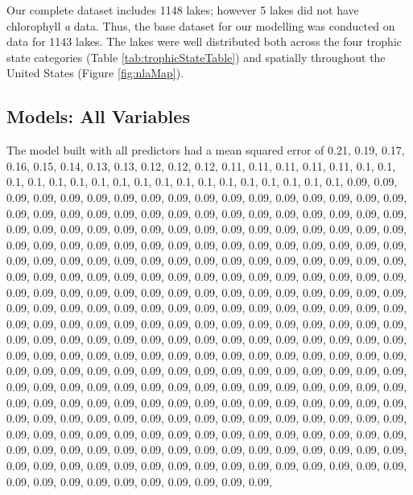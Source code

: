 \documentclass[11pt,]{article}
\begin{document}
Our complete dataset includes 1148 lakes; however 5 lakes did not have
chlorophyll \emph{a} data. Thus, the base dataset for our modelling was
conducted on data for 1143 lakes. The lakes were well distributed both
across the four trophic state categories (Table
\ref{tab:trophicStateTable}) and spatially throughout the United States
(Figure \ref{fig:nlaMap}).

\subsection{Models: All Variables}\label{models-all-variables}

The model built with all predictors had a mean squared error of 0.21,
0.19, 0.17, 0.16, 0.15, 0.14, 0.13, 0.13, 0.12, 0.12, 0.12, 0.11, 0.11,
0.11, 0.11, 0.11, 0.1, 0.1, 0.1, 0.1, 0.1, 0.1, 0.1, 0.1, 0.1, 0.1, 0.1,
0.1, 0.1, 0.1, 0.1, 0.1, 0.1, 0.1, 0.09, 0.09, 0.09, 0.09, 0.09, 0.09,
0.09, 0.09, 0.09, 0.09, 0.09, 0.09, 0.09, 0.09, 0.09, 0.09, 0.09, 0.09,
0.09, 0.09, 0.09, 0.09, 0.09, 0.09, 0.09, 0.09, 0.09, 0.09, 0.09, 0.09,
0.09, 0.09, 0.09, 0.09, 0.09, 0.09, 0.09, 0.09, 0.09, 0.09, 0.09, 0.09,
0.09, 0.09, 0.09, 0.09, 0.09, 0.09, 0.09, 0.09, 0.09, 0.09, 0.09, 0.09,
0.09, 0.09, 0.09, 0.09, 0.09, 0.09, 0.09, 0.09, 0.09, 0.09, 0.09, 0.09,
0.09, 0.09, 0.09, 0.09, 0.09, 0.09, 0.09, 0.09, 0.09, 0.09, 0.09, 0.09,
0.09, 0.09, 0.09, 0.09, 0.09, 0.09, 0.09, 0.09, 0.09, 0.09, 0.09, 0.09,
0.09, 0.09, 0.09, 0.09, 0.09, 0.09, 0.09, 0.09, 0.09, 0.09, 0.09, 0.09,
0.09, 0.09, 0.09, 0.09, 0.09, 0.09, 0.09, 0.09, 0.09, 0.09, 0.09, 0.09,
0.09, 0.09, 0.09, 0.09, 0.09, 0.09, 0.09, 0.09, 0.09, 0.09, 0.09, 0.09,
0.09, 0.09, 0.09, 0.09, 0.09, 0.09, 0.09, 0.09, 0.09, 0.09, 0.09, 0.09,
0.09, 0.09, 0.09, 0.09, 0.09, 0.09, 0.09, 0.09, 0.09, 0.09, 0.09, 0.09,
0.09, 0.09, 0.09, 0.09, 0.09, 0.09, 0.09, 0.09, 0.09, 0.09, 0.09, 0.09,
0.09, 0.09, 0.09, 0.09, 0.09, 0.09, 0.09, 0.09, 0.09, 0.09, 0.09, 0.09,
0.09, 0.09, 0.09, 0.09, 0.09, 0.09, 0.09, 0.09, 0.09, 0.09, 0.09, 0.09,
0.09, 0.09, 0.09, 0.09, 0.09, 0.09, 0.09, 0.09, 0.09, 0.09, 0.09, 0.09,
0.09, 0.09, 0.09, 0.09, 0.09, 0.09, 0.09, 0.09, 0.09, 0.09, 0.09, 0.09,
0.09, 0.09, 0.09, 0.09, 0.09, 0.09, 0.09, 0.09, 0.09, 0.09, 0.09, 0.09,
0.09, 0.09, 0.09, 0.09, 0.09, 0.09, 0.09, 0.09, 0.09, 0.09, 0.09, 0.09,
0.09, 0.09, 0.09, 0.09, 0.09, 0.09, 0.09, 0.09, 0.09, 0.09, 0.09, 0.09,
0.09, 0.09, 0.09, 0.09, 0.09, 0.09, 0.09, 0.09, 0.09, 0.09, 0.09, 0.09,
0.09, 0.09, 0.09, 0.09, 0.09, 0.09, 0.09, 0.09, 0.09, 0.09, 0.09, 0.09,
0.09, 0.09, 0.09, 0.09, 0.09, 0.09, 0.09, 0.09, 0.09, 0.09, 0.09, 0.09,
\end{document}
